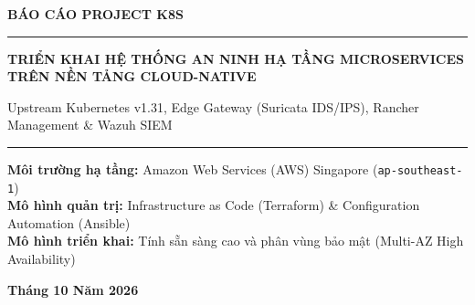 \documentclass[12pt,a4paper]{report}
\begin{document}
\begin{titlepage}
    \centering
    \vspace*{2cm}
    
    {\Huge \bfseries \color{darkblue} BÁO CÁO PROJECT K8S \par}
    
    \vspace{1.5cm}
    \rule{\textwidth}{1.5pt}\par
    \vspace{0.8cm}
    
    {\Large \bfseries TRIỂN KHAI HỆ THỐNG AN NINH HẠ TẦNG MICROSERVICES TRÊN NỀN TẢNG CLOUD-NATIVE \par}
    \vspace{0.5cm}
    {\large Upstream Kubernetes v1.31, Edge Gateway (Suricata IDS/IPS), Rancher Management \& Wazuh SIEM \par}
    
    \vspace{0.8cm}
    \rule{\textwidth}{1.5pt}\par
    
    \vfill
    
    \begin{minipage}{0.8\textwidth}
        \centering
        \textbf{Môi trường hạ tầng:} Amazon Web Services (AWS) Singapore (\texttt{ap-southeast-1}) \\
        \textbf{Mô hình quản trị:} Infrastructure as Code (Terraform) \& Configuration Automation (Ansible) \\
        \textbf{Mô hình triển khai:} Tính sẵn sàng cao và phân vùng bảo mật (Multi-AZ High Availability)
    \end{minipage}
    
    \vfill
    
    {\large \bfseries Tháng 10 Năm 2026 \par}
    \vspace*{1cm}
\end{titlepage}

\tableofcontents
\newpage
\listoffigures
\listoftables
\newpage
\end{document}
